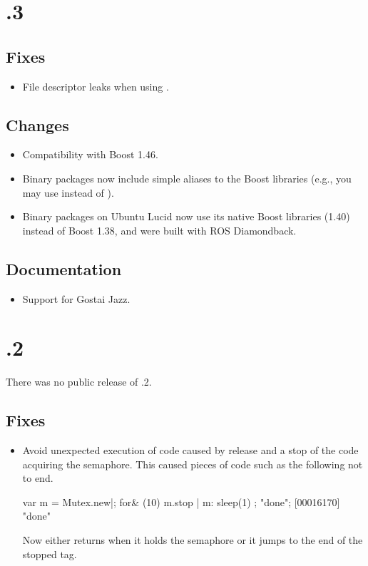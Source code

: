 \section{.3}

\subsection{Fixes}
\begin{itemize}
\item File descriptor leaks when using .
\end{itemize}

\subsection{Changes}
\begin{itemize}
\item Compatibility with Boost 1.46.

\item Binary packages now include simple aliases to the Boost libraries
  (e.g., you may use  instead of
  ).

\item Binary packages on Ubuntu Lucid now use its native Boost libraries
  (1.40) instead of Boost 1.38, and were built with ROS Diamondback.
\end{itemize}

\subsection{Documentation}
\begin{itemize}
\item Support for Gostai Jazz.
\end{itemize}


\section{.2}

There was no public release of .2.

\subsection{Fixes}
\begin{itemize}
\item Avoid unexpected execution of code caused by 
  release and a stop of the code acquiring the semaphore.  This caused
  pieces of code such as the following not to end.
\begin{urbiscript}
var m = Mutex.new|;
for& (10)
  { m.stop | m: { sleep(1) } };
"done";
[00016170] "done"
\end{urbiscript}

  Now  either returns when it holds the
  semaphore or it jumps to the end of the stopped tag.
\end{itemize}


